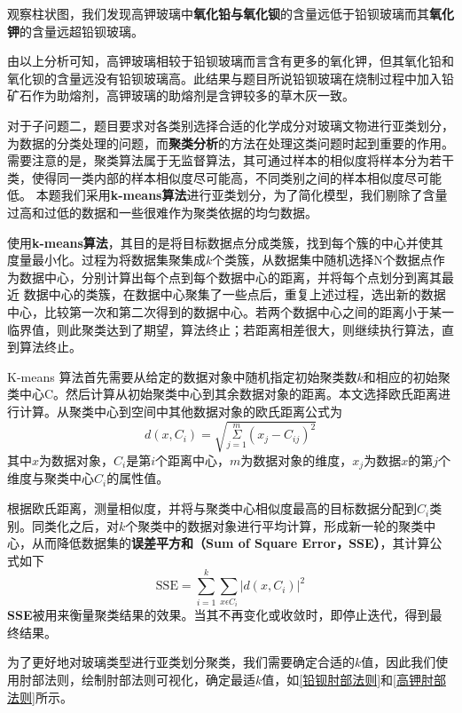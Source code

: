 \documentclass{MathModeling}
\begin{document}
	观察柱状图，我们发现高钾玻璃中{\textbf{氧化铅与氧化钡}}的含量远低于铅钡玻璃而其{\textbf{氧化钾}}的含量远超铅钡玻璃。

	由以上分析可知，{\heiti 高钾玻璃}相较于铅钡玻璃而言含有{\heiti 更多的氧化钾}，但其氧化铅和氧化钡的含量远没有铅钡玻璃高。{\heiti 此结果与题目所说铅钡玻璃在烧制过程中加入铅矿石作为助熔剂，高钾玻璃的助熔剂是含钾较多的草木灰一致}。

	{\heiti 对于子问题二}，题目要求对各类别选择合适的化学成分对玻璃文物进行亚类划分，为数据的分类处理的问题，而{\textbf{聚类分析}}的方法在处理这类问题时起到重要的作用。需要注意的是，{\heiti 聚类算法}属于无监督算法，其可通过样本的相似度将样本分为若干类，使得同一类内部的样本相似度尽可能高，不同类别之间的样本相似度尽可能低。
	本题我们采用{\textbf{k-means算法}}进行亚类划分，为了简化模型，我们剔除了含量过高和过低的数据和一些很难作为聚类依据的均匀数据。

	使用{\textbf{k-means算法}}，其目的是将目标数据点分成类簇，找到每个簇的中心并使其度量最小化。过程为将数据集聚集成$k$个类簇，从数据集中随机选择N个数据点作为数据中心，分别计算出每个点到每个数据中心的距离，并将每个点划分到离其最近
	数据中心的类簇，在数据中心聚集了一些点后，重复上述过程，选出新的数据中心，比较第一次和第二次得到的数据中心。若两个数据中心之间的距离小于某一临界值，则此聚类达到了期望，算法终止；若距离相差很大，则继续执行算法，直到算法终止。
	
	K-means 算法{\heiti 首先}需要从给定的数据对象中随机指定初始聚类数$k$和相应的初始聚类中心C。然后计算从初始聚类中心到其余数据对象的距离。本文选择欧氏距离进行计算。从聚类中心到空间中其他数据对象的欧氏距离公式为
	\begin{equation}
		d\left( x,C_i \right) =\sqrt{\underset{j=1}{\overset{m}{\varSigma}}\left( x_j-C_{ij} \right) ^2}
	\end{equation}
	其中$x$为数据对象，$C_i$是第$i$个距离中心，$m$为数据对象的维度，$x_j$为数据$x$的第$j$个维度与聚类中心$C_i$的属性值。

	根据欧氏距离，测量相似度，并将与聚类中心相似度最高的目标数据分配到$C_i$类别。同类化之后，对$k$个聚类中的数据对象进行平均计算，形成新一轮的聚类中心，从而降低数据集的{\textbf{误差平方和（Sum of Square Error，SSE）}}，其计算公式如下
	\begin{equation}
		\mathrm{SSE}=\sum_{i=1}^{k}\sum_{x\epsilon C_i}\left| d\left( x,C_i \right) \right|^2
	\end{equation}
	{\textbf{SSE}}被用来衡量聚类结果的效果。当其不再变化或收敛时，即停止迭代，得到最终结果。

	为了更好地对玻璃类型进行亚类划分聚类，我们需要确定合适的$k$值，因此我们使用肘部法则，绘制肘部法则可视化，确定最适$k$值，如\textcolor{blue}{\cref{铅钡肘部法则}}和\textcolor{blue}{\cref{高钾肘部法则}}所示。
	
\end{document}
